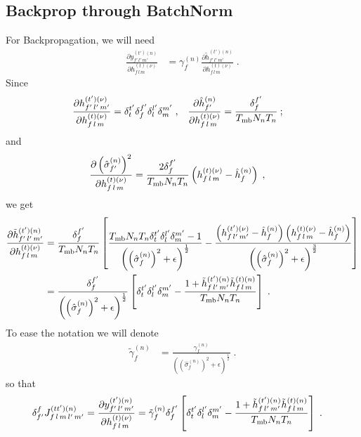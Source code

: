 \begin{subappendices}
\section{Backprop through BatchNorm} \label{sec:appenbatchnorm-vgg}


For Backpropagation, we will need 
\begin{align}
\frac{\partial y^{(t')(n)}_{f'\,l'\,m'}}{\partial h_{f\,l\,m}^{(t)(\nu)}}&=
%
\gamma^{(n)}_f\frac{\partial \tilde{h}_{f'\,l'\,m'}^{(t')(n)}}{\partial h_{f\,l\,m}^{(t)(\nu)}}\;.
\end{align}
Since
\begin{align}
\frac{\partial h^{(t')(\nu)}_{f'\,l'\,m'}}{\partial h_{f\,l\,m}^{(t)(\nu)}}&=\delta^{t'}_t\delta^{f'}_f
%
\delta^{l'}_l\delta^{m'}_m\;,&
%
\frac{\partial \hat{h}_{f'}^{(n)}}{\partial h_{f\,l\,m}^{(t)(\nu)}}&=\frac{\delta^{f'}_f}{T_{{\rm mb}}N_nT_n}\:;
\end{align}
and
\begin{align}
\frac{\partial \left(\hat{\sigma}_{f'}^{(n)}\right)^2}{\partial h_{f\,l\,m}^{(t)(\nu)}}&=
%
\frac{2\delta^{f'}_f}{T_{{\rm mb}}N_nT_n}\left(h_{f\,l\,m}^{(t)(\nu)}-\hat{h}_{f}^{(n)}\right)\;,
\end{align}
we get
\begin{align}
\frac{\partial \tilde{h}_{f'\,l'\,m'}^{(t')(n)}}{\partial h_{f\,l\,m}^{(t)(\nu)}}&=
%
\frac{\delta^{f'}_f}{T_{{\rm mb}}N_nT_n}\left[\frac{T_{{\rm mb}}N_nT_n\delta^{t'}_t
%
\delta^{l'}_l\delta^{m'}_m-1}
%
{\left(\left(\hat{\sigma}_{f}^{(n)}\right)^2+\epsilon\right)^\frac12}-
%
\frac{\left(h_{f\,l'\,m'}^{(t')(\nu)}-\hat{h}_{f}^{(n)}\right)\left(h_{f\,l\,m}^{(t)(\nu)}-\hat{h}_{f}^{(n)}\right)}
%
{\left(\left(\hat{\sigma}_{f}^{(n)}\right)^2+\epsilon\right)^\frac32}\right]\notag\\
%
&=\frac{\delta^{f'}_f}{\left(\left(\hat{\sigma}_{f}^{(n)}\right)^2+\epsilon\right)^\frac12}
%
\left[\delta^{t'}_t\delta^{l'}_l\delta^{m'}_m-
%
\frac{1+\tilde{h}_{f\,l'\,m'}^{(t')(n)}\tilde{h}_{f\,l\,m}^{(t)(n)}}{T_{{\rm mb}}N_nT_n}\right]\;.
\end{align}
To ease the notation we will denote
\begin{align}
\tilde{\gamma}^{(n)}_f&=
%
\frac{\gamma^{(n)}_f}{\left(\left(\hat{\sigma}_{f}^{(n)}\right)^2+\epsilon\right)^\frac12}\;.
\end{align}
%
%
%
so that
\begin{align}
\delta^f_{f'}J^{(tt')(n)}_{f\,l\,m\,l'\,m'}&=
%
\frac{\partial y_{f'\,l'\,m'}^{(t')(n)}}{\partial h_{f\,l\,m}^{(t)(\nu)}}=
%
\tilde{\gamma}^{(n)}_f \delta^{f'}_f\left[\delta^{t'}_t\delta^{l'}_l\delta^{m'}_m-
%
\frac{1+\tilde{h}_{f\,l'\,m'}^{(t')(n)}\tilde{h}_{f\,l\,m}^{(t)(n)}}{T_{{\rm mb}}N_nT_n}\right]\;.
\end{align}


\end{subappendices}
